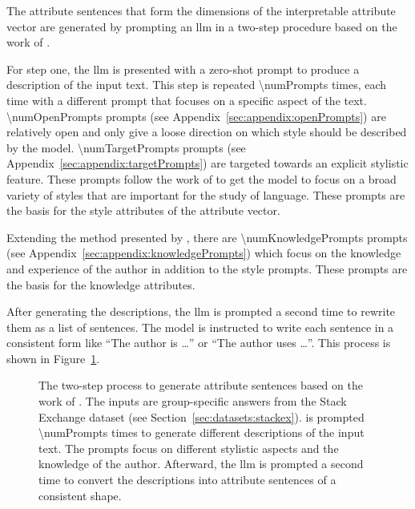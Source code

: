 The attribute sentences that form the dimensions of the interpretable attribute vector are generated by prompting an \acf{llm} in a two-step procedure based on the work of \citet{patelLearningInterpretableStyle2023}.

For step one, the \ac{llm} is presented with a zero-shot prompt to produce a description of the input text. This step is repeated \num{\numPrompts} times, each time with a different prompt that focuses on a specific aspect of the text. \num{\numOpenPrompts} prompts (see Appendix~\ref{sec:appendix:openPrompts}) are relatively open and only give a loose direction on which style should be described by the model. \num{\numTargetPrompts} prompts (see Appendix~\ref{sec:appendix:targetPrompts}) are targeted towards an explicit stylistic feature. These prompts follow the work of \citet{patelLearningInterpretableStyle2023,tausczikPsychologicalMeaningWords2010} to get the model to focus on a broad variety of styles that are important for the study of language. These prompts are the basis for the style attributes of the attribute vector.

Extending the method presented by \citet{patelLearningInterpretableStyle2023}, there are \num{\numKnowledgePrompts} prompts (see Appendix~\ref{sec:appendix:knowledgePrompts}) which focus on the knowledge and experience of the author in addition to the style prompts. These prompts are the basis for the knowledge attributes.

After generating the descriptions, the \ac{llm} is prompted a second time to rewrite them as a list of sentences. The model is instructed to write each sentence in a consistent form like \enquote{The author is \ldots} or \enquote{The author uses \ldots}. This process is shown in Figure~\ref{fig:attributeSentenceGeneration}.

\begin{figure}[ht]
  
  \caption{The two-step process to generate attribute sentences based on the work of \citet{patelLearningInterpretableStyle2023}. The inputs are group-specific answers from the Stack Exchange dataset (see Section~\ref{sec:datasets:stackex}).  is prompted \num{\numPrompts} times to generate different descriptions of the input text. The prompts focus on different stylistic aspects and the knowledge of the author. Afterward, the \ac{llm} is prompted a second time to convert the descriptions into attribute sentences of a consistent shape.}%
  \label{fig:attributeSentenceGeneration}
\end{figure}

